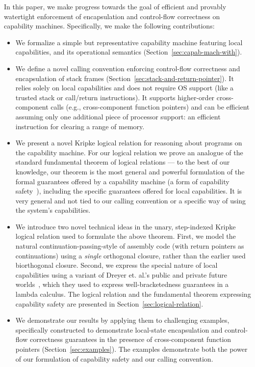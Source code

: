 \documentclass[acmsmall,review]{acmart}\settopmatter{printfolios=true}
\begin{document}
In this paper, we make progress towards the goal of efficient and provably
watertight enforcement of encapsulation and control-flow correctness on
capability machines. Specifically, we make the following contributions:
\begin{itemize}
\item We formalize a simple but representative capability machine featuring local
  capabilities, and its operational semantics
  (Section~\ref{sec:capab-mach-with}).
\item We define a novel calling convention enforcing control-flow correctness and
  encapsulation of stack frames (Section~\ref{sec:stack-and-return-pointer}). It
  relies solely on local capabilities and does not require OS support (like a
  trusted stack or call/return instructions).
  It supports higher-order cross-component calls (e.g., cross-component function
  pointers) and can be efficient assuming only one additional piece of processor
  support: an efficient instruction for clearing a range of memory.
\item We present a novel Kripke logical relation for reasoning about programs on the
  capability machine. For our logical relation we prove an analogue of
  the standard fundamental theorem of logical relations --- to the
  best of our knowledge, our theorem
  is %
  the most general and powerful formulation of the formal guarantees offered by a
  capability machine (a form of capability
  safety~\citep{Devriese:2016ObjCap,Maffeis2010OC}), including the specific
  guarantees offered for local capabilities. It is very general and not tied to
  our calling convention or a specific way of using the system's capabilities.
\item We introduce two novel technical ideas in the unary, step-indexed Kripke
  logical relation used to formulate the above theorem. First, we model the
  natural continuation-passing-style of assembly code (with return pointers as
  continuations) using a \emph{single} orthogonal closure, rather than
  the earlier used biorthogonal closure. Second, we express the special nature of
  local capabilities using a variant of Dreyer et. al.'s public and private
  future worlds~\citep{Dreyer:jfp12}, which they used to express well-bracketedness
  guarantees in a lambda calculus. The logical relation and the
  fundamental theorem expressing capability safety
  are presented in Section~\ref{sec:logical-relation}.
\item We demonstrate our results by applying them to challenging examples,
  specifically constructed to demonstrate local-state encapsulation and
  control-flow correctness guarantees in the presence of cross-component
  function pointers (Section~\ref{sec:examples}). The examples demonstrate both
  the power of our formulation of capability safety and our calling convention.
\end{itemize}
\end{document}
